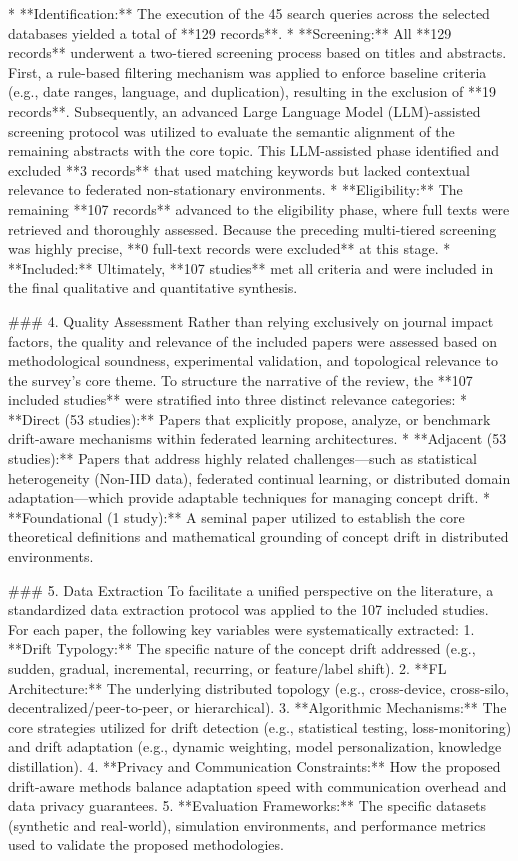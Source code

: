 \documentclass[journal]{IEEEtran}
\begin{document}
*   **Identification:** The execution of the 45 search queries across the selected databases yielded a total of **129 records**. 
*   **Screening:** All **129 records** underwent a two-tiered screening process based on titles and abstracts. First, a rule-based filtering mechanism was applied to enforce baseline criteria (e.g., date ranges, language, and duplication), resulting in the exclusion of **19 records**. Subsequently, an advanced Large Language Model (LLM)-assisted screening protocol was utilized to evaluate the semantic alignment of the remaining abstracts with the core topic. This LLM-assisted phase identified and excluded **3 records** that used matching keywords but lacked contextual relevance to federated non-stationary environments.
*   **Eligibility:** The remaining **107 records** advanced to the eligibility phase, where full texts were retrieved and thoroughly assessed. Because the preceding multi-tiered screening was highly precise, **0 full-text records were excluded** at this stage.
*   **Included:** Ultimately, **107 studies** met all criteria and were included in the final qualitative and quantitative synthesis. 

### 4. Quality Assessment
Rather than relying exclusively on journal impact factors, the quality and relevance of the included papers were assessed based on methodological soundness, experimental validation, and topological relevance to the survey's core theme. To structure the narrative of the review, the **107 included studies** were stratified into three distinct relevance categories:
*   **Direct (53 studies):** Papers that explicitly propose, analyze, or benchmark drift-aware mechanisms within federated learning architectures.
*   **Adjacent (53 studies):** Papers that address highly related challenges—such as statistical heterogeneity (Non-IID data), federated continual learning, or distributed domain adaptation—which provide adaptable techniques for managing concept drift.
*   **Foundational (1 study):** A seminal paper utilized to establish the core theoretical definitions and mathematical grounding of concept drift in distributed environments.

### 5. Data Extraction
To facilitate a unified perspective on the literature, a standardized data extraction protocol was applied to the 107 included studies. For each paper, the following key variables were systematically extracted:
1.  **Drift Typology:** The specific nature of the concept drift addressed (e.g., sudden, gradual, incremental, recurring, or feature/label shift).
2.  **FL Architecture:** The underlying distributed topology (e.g., cross-device, cross-silo, decentralized/peer-to-peer, or hierarchical).
3.  **Algorithmic Mechanisms:** The core strategies utilized for drift detection (e.g., statistical testing, loss-monitoring) and drift adaptation (e.g., dynamic weighting, model personalization, knowledge distillation).
4.  **Privacy and Communication Constraints:** How the proposed drift-aware methods balance adaptation speed with communication overhead and data privacy guarantees.
5.  **Evaluation Frameworks:** The specific datasets (synthetic and real-world), simulation environments, and performance metrics used to validate the proposed methodologies. 
\end{document}
